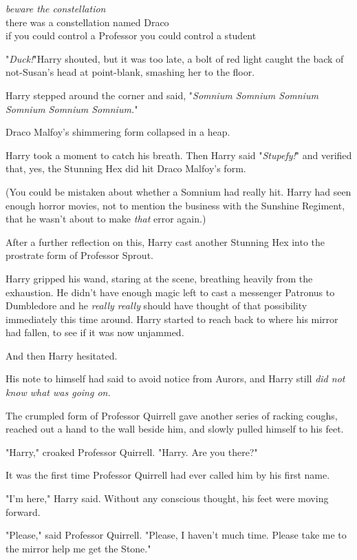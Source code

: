 \noindent{}\emph{beware the constellation}\\
there was a constellation named Draco\\
if you could control a Professor you could control a student

"\emph{Duck!}"Harry shouted, but it was too late, a bolt of red light caught
the back of not-Susan's head at point-blank, smashing her to the floor.

Harry stepped around the corner and said, "\emph{Somnium Somnium Somnium
Somnium Somnium Somnium.}"

Draco Malfoy's shimmering form collapsed in a heap.

Harry took a moment to catch his breath. Then Harry said "\emph{Stupefy!}" and
verified that, yes, the Stunning Hex did hit Draco Malfoy's form.

(You could be mistaken about whether a Somnium had really hit. Harry had seen
enough horror movies, not to mention the business with the Sunshine Regiment,
that he wasn't about to make \emph{that} error again.)

After a further reflection on this, Harry cast another Stunning Hex into the
prostrate form of Professor Sprout.

Harry gripped his wand, staring at the scene, breathing heavily from the
exhaustion. He didn't have enough magic left to cast a messenger Patronus to
Dumbledore and he \emph{really really} should have thought of that possibility
immediately this time around. Harry started to reach back to where his mirror
had fallen, to see if it was now unjammed.

And then Harry hesitated.

His note to himself had said to avoid notice from Aurors, and Harry still
\emph{did not know what was going on.}

The crumpled form of Professor Quirrell gave another series of racking coughs,
reached out a hand to the wall beside him, and slowly pulled himself to his
feet.

"Harry," croaked Professor Quirrell. "Harry. Are you there?"

It was the first time Professor Quirrell had ever called him by his first name.

"I'm here," Harry said. Without any conscious thought, his feet were moving
forward.

"Please," said Professor Quirrell. "Please, I haven't{\el} much time. Please
take me{\el} to the mirror{\el} help me{\el} get the Stone."

